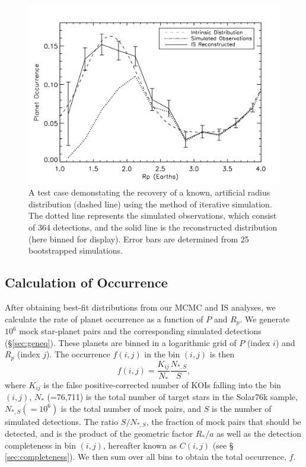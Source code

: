\begin{figure}[h]
\centerline{\includegraphics[scale=0.55]{chap2/IStest.pdf}}
\caption{A test case demonstating the recovery of a known, artificial
  radius distribution (dashed line) using the method of iterative
  simulation.  The dotted line represents the simulated observations,
  which consist of 364 detections, and the solid line is the
  reconstructed distribution (here binned for display).  Error
  bars are determined from 25 bootstrapped simulations.}
\label{fig:IS}
\end{figure}

\subsection{Calculation of Occurrence}
\label{sec:calocc}

After obtaining best-fit distributions from our MCMC and IS
analyses, we calculate the rate of planet occurrence as a function
of $P$ and $R_p$. We generate $10^6$ mock star-planet pairs and the corresponding
simulated detections (\S \ref{sec:geneq}). These planets are binned in
a logarithmic grid of $P$ (index $i$) and $R_p$ (index $j$). The
occurrence $f(i,j)$ in the bin $(i,j)$ is then
\begin{equation}
f(i,j) = \frac{K_{ij}}{N_*}\frac{N_{*,S}}{S},
\label{eq:ISocc}
\end{equation}
where $K_{ij}$ is the false positive-corrected \citep[Table
1,][]{Fressin2013} number of KOIs falling into the bin $(i,j)$,
$N_{*}$ (=76,711) is the total number of \kep{} target stars in
the Solar76k sample, $N_{*,S} (=10^6)$ is the total number of
mock pairs, and $S$ is the number of simulated detections.  
The ratio $S/N_{*,S}$, the fraction of mock pairs that should be detected, 
and is the product of the geometric factor $R_*/a$ as well as the detection 
completeness in bin $(i,j)$, hereafter known as $C(i,j)$ (see \S
\ref{sec:completeness}).  We then sum over all bins to obtain the total 
occurrence, $f$.

